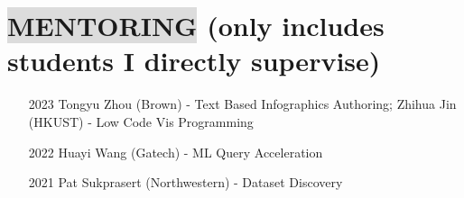 \section*{
    \colorbox{gainsboro}{MENTORING}  {\small \normalfont (only includes students I directly supervise)}
}
\begin{itemize}[leftmargin=16.5mm,labelsep=9mm,noitemsep]
    \item[2023] Tongyu Zhou (Brown) - Text Based Infographics Authoring; Zhihua Jin (HKUST) - Low Code Vis Programming
    \item[2022] Huayi Wang (Gatech) - ML Query Acceleration
    \item[2021] Pat Sukprasert (Northwestern) - Dataset Discovery
\end{itemize}